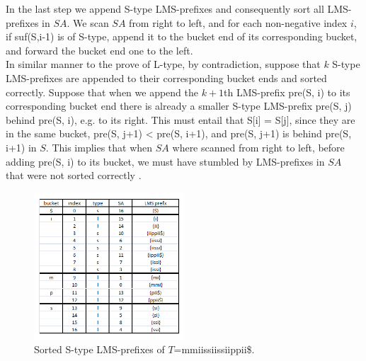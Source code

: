 \documentclass[12pt]{article} %
\begin{document}
In the last step we append S-type LMS-prefixes and consequently sort all LMS-prefixes in $SA$. We scan $SA$ from right to left, and for each non-negative index $i$, if suf(S,i-1) is of S-type, append it to the bucket end of its corresponding bucket, and forward the bucket end one to the left. \\
In similar manner to the prove of L-type, by contradiction, suppose that $k$ S-type LMS-prefixes are appended to their corresponding bucket ends and sorted correctly. Suppose that when we append the $k+1$th LMS-prefix pre(S, i) to its corresponding bucket end there is already a smaller S-type LMS-prefix pre(S, j) behind pre(S, i), e.g. to its right. This must entail that S[i] = S[j], since they are in the same bucket, pre(S, j+1) < pre(S, i+1), and pre(S, j+1) is behind pre(S, i+1) in $S$. This implies that when $SA$ where scanned from right to left, before adding pre(S, i) to its bucket, we must have stumbled by LMS-prefixes in $SA$ that were not sorted correctly \cite{twoeffecient}.
\begin{figure}[H]
    \centering
    \includegraphics[width=0.5\textwidth]{lmssorteds}
    \captionsetup{width=0.8\textwidth}
    \caption{Sorted S-type LMS-prefixes of  $T$=mmiissiissiippii\$.}
    \label{fig:lmssorteds}  
\end{figure}
\end{document}
